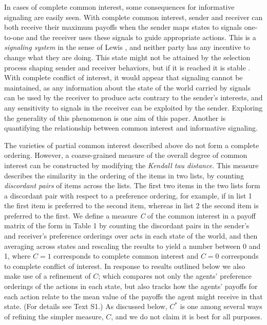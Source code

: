 \documentclass[10pt]{article}
\begin{document}
In cases of complete common interest, some consequences for informative
signaling are easily seen. With complete common interest, sender and
receiver can both receive their maximum payoffs when the sender maps
states to signals one-to-one and the receiver uses these signals to
guide appropriate actions. This is a \emph{signaling system} in the
sense of Lewis \cite{Lewis1969}, and neither party has any incentive to change what
they are doing. This state might not be attained by the selection
process shaping sender and receiver behaviors, but if it is reached it
is stable \cite{Huttegger2010}. With complete conflict of interest, it would appear that
signaling cannot be maintained, as any information about the state of
the world carried by signals can be used by the receiver to produce acts
contrary to the sender's interests, and any sensitivity to signals in
the receiver can be exploited by the sender. Exploring the generality of
this phenomenon is one aim of this paper. Another is quantifying the
relationship between common interest and informative signaling.

The varieties of partial common interest described above do not form a
complete ordering. However, a coarse-grained measure of the overall
degree of common interest can be constructed by modifying the
\emph{Kendall tau distance}. This measure describes the similarity in
the ordering of the items in two lists, by counting \emph{discordant
pairs} of items across the lists. The first two items in the two lists
form a discordant pair with respect to a preference ordering, for
example, if in list 1 the first item is preferred to the second item,
whereas in list 2 the second item is preferred to the first. We define a
measure \emph{C} of the common interest in a payoff matrix of the form
in Table 1 by counting the discordant pairs in the sender's and
receiver's preference orderings over acts in each state of the world, and
then averaging across states and rescaling the results to yield a number
between 0 and 1, where $C=1$ corresponds to complete common interest and
$C=0$ corresponds to complete conflict of interest. In response to
results outlined below we also make use of a refinement of $C$; which
compares not only the agents' preference orderings of the actions in
each state, but also tracks how the agents' payoffs for each action relate to the mean
value of the payoffs the agent might receive in that state. (For details see Text S1.) As discussed below, $C^*$ is one
among several ways of refining the simpler measure, $C$, and we do not
claim it is best for all purposes.
\end{document}
